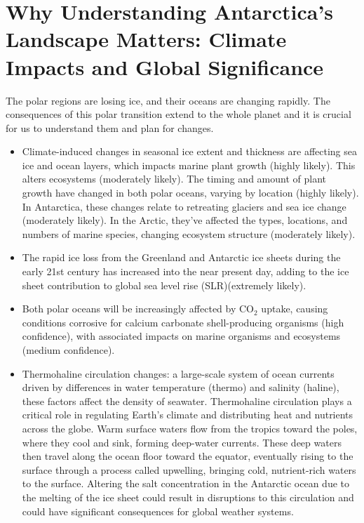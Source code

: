 \chapter{Why Understanding Antarctica's Landscape Matters: Climate Impacts and Global Significance}\label{n1}

The polar regions are losing ice, and their oceans are changing rapidly\cite{O_C_in_changingClimate}. The consequences of this polar transition extend to the whole planet and it is crucial for us to understand them and plan for changes.
\begin{itemize}
\item Climate-induced changes in seasonal ice extent and thickness are affecting sea ice and ocean layers, which impacts marine plant growth (highly likely). This alters ecosystems (moderately likely). The timing and amount of plant growth have changed in both polar oceans, varying by location (highly likely). In Antarctica, these changes relate to retreating glaciers and sea ice change (moderately likely). In the Arctic, they've affected the types, locations, and numbers of marine species, changing ecosystem structure (moderately likely)\cite{O_C_in_changingClimate}.
\item The rapid ice loss from the Greenland and Antarctic ice sheets during the early 21st century has increased into the near present day, adding to the ice sheet contribution to global sea level rise (SLR)(extremely likely)\cite{O_C_in_changingClimate}.
\item Both polar oceans will be increasingly affected by $\mathrm{CO_2}$ uptake, causing conditions corrosive for calcium carbonate shell-producing organisms (high confidence), with associated impacts on marine organisms and ecosystems (medium confidence)\cite{O_C_in_changingClimate}.
\item Thermohaline circulation changes: a large-scale system of ocean currents driven by differences in water temperature (thermo) and salinity (haline), these factors affect the density of seawater. Thermohaline circulation plays a critical role in regulating Earth's climate and distributing heat and nutrients across the globe. Warm surface waters flow from the tropics toward the poles, where they cool and sink, forming deep-water currents. These deep waters then travel along the ocean floor toward the equator, eventually rising to the surface through a process called upwelling, bringing cold, nutrient-rich waters to the surface\cite{JACOBS_2004}. Altering the salt concentration in the Antarctic ocean due to the melting of the ice sheet could result in disruptions to this circulation and could have significant consequences for global weather systems.
\end{itemize}

